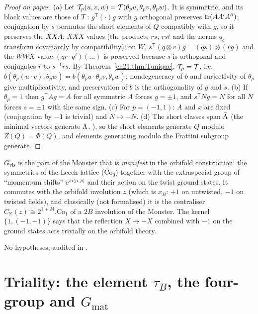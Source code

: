 \begin{proof}[Proof on paper]
(a) Let $\mathcal{T}_p(u,v,w)=\mathcal{T}(\theta_pu,\theta_pv,\theta_pw)$.  It is symmetric, and its block values are
those of $\mathcal{T}$: $g^{\mathsf T}(\cdot)g$ with $g$ orthogonal preserves $\operatorname{tr}(AA'A'')$; conjugation by $s$
permutes the short elements of $Q$ compatibly with $g$, so it preserves the $XXA$, $XXX$ values (the
products $rs$, $rst$ and the norms $q_c$ transform covariantly by compatibility); on $W$,
$s^{\mathsf T}(q\otimes v)g=(qs)\otimes(vg)$ and the $WWX$ value
$(qr\cdot q')(\dots)$ is preserved because $s$ is orthogonal and conjugates $r$ to $s^{-1}rs$.  By
Theorem~\ref{ch21:thm:Tunique}, $\mathcal{T}_p=\mathcal{T}$, i.e.\ $b(\theta_p(u\cdot v),\theta_pw)=b(\theta_pu\cdot\theta_pv,\theta_pw)$;
nondegeneracy of $b$ and surjectivity of $\theta_p$ give multiplicativity, and preservation of $b$ is
the orthogonality of $g$ and $s$.  (b) If $\theta_p=1$ then $g^{\mathsf T}Ag=A$ for all symmetric $A$
forces $g=\pm1$, and $s^{\mathsf T}Ng=N$ for all $N$ forces $s=\pm1$ with the same sign.  (c) For
$p=(-1,1)$: $A$ and $x$ are fixed (conjugation by $-1$ is trivial) and $N\mapsto-N$.  (d) The short
classes span $\bar{\Lambda}$ (the minimal vectors generate ${\Lambda}$, ), so the
short elements generate $Q$ modulo $Z(Q)=\Phi(Q)$, and elements generating modulo the Frattini subgroup
generate.
\end{proof}
\begin{physics}
$G_{\mathrm{vis}}$ is the part of the Monster that is \emph{manifest} in the orbifold construction:
the symmetries of the Leech lattice ($\mathrm{Co}_0$) together with the extraspecial group of
``momentum shifts'' $e^{\pi i\langle\mu,p\rangle}$ and their action on the twist ground states.  It
commutes with the orbifold involution $z$ (which is $x_B$: $+1$ on untwisted, $-1$ on twisted
fields), and classically (not formalised) it is the centraliser $C_{\mathbb M}(z)\cong2^{1+24}.\mathrm{Co}_1$
of a $2B$ involution of the Monster.  The kernel $\{1,(-1,-1)\}$ says that the reflection $X\mapsto-X$ combined with
$-1$ on the ground states acts trivially on the orbifold theory.
\end{physics}
\begin{status}
No hypotheses; audited in .
\end{status}

\section{Triality: the element \texorpdfstring{$\tau_B$}{tauB}, the four-group and \texorpdfstring{$G_{\mathrm{mat}}$}{Gmat}}\label{ch21:sec:triality}

